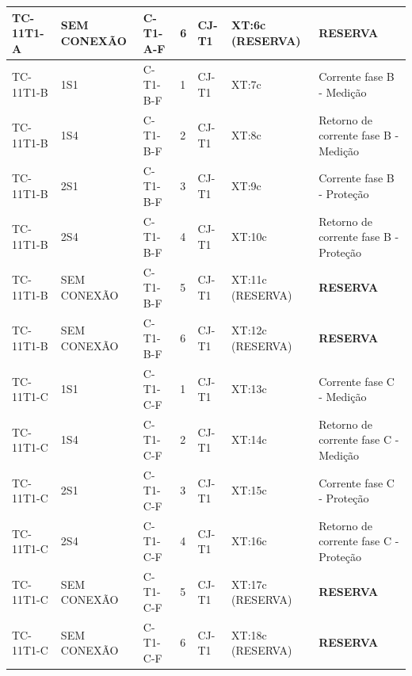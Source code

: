 \documentclass[11pt,a4paper]{article}
\newcommand{\res}{\textbf{RESERVA}}
\begin{document}
\begin{landscape}
\begin{longtable}{@{}L{2.5cm}L{2.8cm}L{2.8cm}L{0.85cm}L{2.4cm}L{3.4cm}L{8.3cm}@{}}
TC-11T1-A & SEM CONEXÃO & C-T1-A-F & 6 & CJ-T1 & XT:6c (RESERVA) & \res{}\\
\midrule
TC-11T1-B & 1S1 & C-T1-B-F & 1 & CJ-T1 & XT:7c & Corrente fase B - Medição\\
TC-11T1-B & 1S4 & C-T1-B-F & 2 & CJ-T1 & XT:8c & Retorno de corrente fase B - Medição\\
TC-11T1-B & 2S1 & C-T1-B-F & 3 & CJ-T1 & XT:9c & Corrente fase B - Proteção\\
TC-11T1-B & 2S4 & C-T1-B-F & 4 & CJ-T1 & XT:10c & Retorno de corrente fase B - Proteção\\
TC-11T1-B & SEM CONEXÃO & C-T1-B-F & 5 & CJ-T1 & XT:11c (RESERVA) & \res{}\\
TC-11T1-B & SEM CONEXÃO & C-T1-B-F & 6 & CJ-T1 & XT:12c (RESERVA) & \res{}\\
\midrule
TC-11T1-C & 1S1 & C-T1-C-F & 1 & CJ-T1 & XT:13c & Corrente fase C - Medição\\
TC-11T1-C & 1S4 & C-T1-C-F & 2 & CJ-T1 & XT:14c & Retorno de corrente fase C - Medição\\
TC-11T1-C & 2S1 & C-T1-C-F & 3 & CJ-T1 & XT:15c & Corrente fase C - Proteção\\
TC-11T1-C & 2S4 & C-T1-C-F & 4 & CJ-T1 & XT:16c & Retorno de corrente fase C - Proteção\\
TC-11T1-C & SEM CONEXÃO & C-T1-C-F & 5 & CJ-T1 & XT:17c (RESERVA) & \res{}\\
TC-11T1-C & SEM CONEXÃO & C-T1-C-F & 6 & CJ-T1 & XT:18c (RESERVA) & \res{}\\
\end{longtable}\endgroup\end{landscape}
\end{document}
